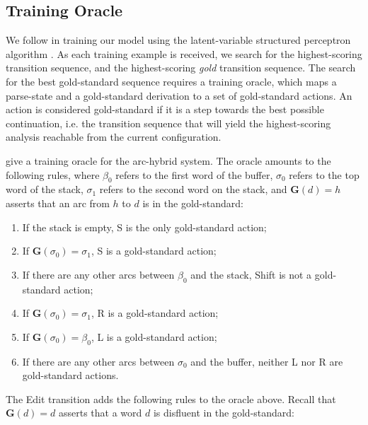 \documentclass[11pt,letterpaper]{article}
\begin{document}
\subsection{Training Oracle}

We follow \citet{honnibal:14} in training our model using the latent-variable
structured perceptron algorithm \citep{sun:09}.  As each training example is
received, we search for the highest-scoring transition sequence, and the highest-scoring
\emph{gold} transition sequence.  The search for the best gold-standard sequence
requires a training oracle, which maps a parse-state and a gold-standard derivation
to a set of gold-standard actions.  An action is considered gold-standard if
it is a step towards the best possible continuation, i.e. the
transition sequence that will yield the highest-scoring analysis reachable from
the current configuration.

\citet{goldberg:13} give a training oracle for the arc-hybrid system.  The oracle
amounts to the following rules, where $\beta_0$ refers to the first word of the
buffer, $\sigma_0$ refers to the top word of the stack, $\sigma_1$ refers
to the second word on the stack, and $\mathbf{G}(d)=h$ asserts that an arc from $h$
to $d$ is in the gold-standard:

\begin{enumerate}
    \item If the stack is empty, S is the only gold-standard action;
    \item If $\mathbf{G}(\sigma_0)=\sigma_1$, S is a gold-standard action; 
    \item If there are any other arcs between $\beta_0$ and the stack, Shift is 
          not a gold-standard action;
      \item If $\mathbf{G}(\sigma_0)=\sigma_1$, R is a gold-standard action;
      \item If $\mathbf{G}(\sigma_0)=\beta_0$, L is a gold-standard action;
    \item If there are any other arcs between $\sigma_0$ and the buffer, neither
          L nor R are gold-standard actions.
\end{enumerate}

\noindent The \citet{honnibal:14} Edit transition adds the following rules to the oracle
above. Recall that $\mathbf{G}(d)=d$ asserts that a word $d$ is disfluent in the
gold-standard:
\end{document}
